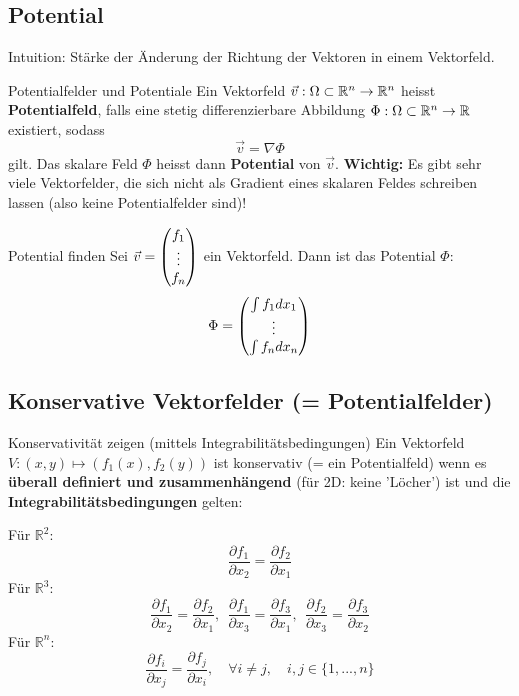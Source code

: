 \subsection{Potential}

Intuition: Stärke der Änderung der Richtung der Vektoren in einem Vektorfeld.

\begin{Definition}{Potentialfelder und Potentiale}{}
	Ein Vektorfeld $\vec{v} : \Omega \subset \mathbb{R}^n \to \mathbb{R}^n$ heisst \textbf{Potentialfeld}, falls eine stetig differenzierbare Abbildung $\Phi : \Omega \subset \mathbb{R}^n \to \mathbb{R}$ existiert, sodass \[\vec{v} = \nabla \Phi\] gilt. Das skalare Feld $\Phi$ heisst dann \textbf{Potential} von $\vec{v}$. \textbf{Wichtig:} Es gibt sehr viele Vektorfelder, die sich nicht als Gradient eines skalaren Feldes schreiben lassen (also keine Potentialfelder sind)!
\end{Definition}

\begin{Rezept}{Potential finden}{}
	Sei $\vec{v} = \begin{pmatrix} f_1 \\ \vdots \\ f_n \end{pmatrix}$ ein Vektorfeld. Dann ist das Potential $\Phi$:
	\[
		\Phi = \begin{pmatrix} \int f_1 dx_1 \\ \vdots \\ \int f_n dx_n \end{pmatrix}
	\]
\end{Rezept}

\subsection{Konservative Vektorfelder (= Potentialfelder)}
\begin{Rezept}{Konservativität zeigen (mittels Integrabilitätsbedingungen)}{}
Ein Vektorfeld $V: (x, y) \mapsto (f_1(x), f_2(y))$ ist konservativ (= ein Potentialfeld) wenn es \textbf{überall definiert
und zusammenhängend} (für 2D: keine 'Löcher') ist und die \textbf{Integrabilitätsbedingungen} gelten:

\begin{multicols}{2}
Für $\mathbb{R}^2$:
\[ \frac{\partial f_1}{\partial x_2} = \frac{\partial f_2}{\partial x_1} \]
Für $\mathbb{R}^3$:
\[ \frac{\partial f_1}{\partial x_2} =  \frac{\partial f_2}{\partial x_1}, 
~~  \frac{\partial f_1}{\partial x_3} = \frac{\partial f_3}{\partial x_1},
~~ \frac{\partial f_2}{\partial x_3} =  \frac{\partial f_3}{\partial x_2}
\]
Für $\mathbb{R}^n$:
\[
	\frac{\partial f_i}{\partial x_j} =  \frac{\partial f_j}{\partial x_i},
	\quad
	\forall i \neq j,
	\quad
	i, j \in \{1,...,n\}
\]
\end{multicols}
\end{Rezept}

